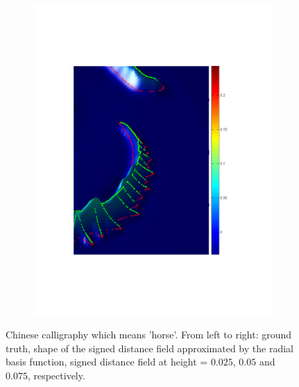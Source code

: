 \documentclass[review]{acmsiggraph}
\begin{document}
\begin{figure}
\begin{subfigure}[b]{0.25\linewidth}
                \includegraphics[width=\textwidth]{images/seahorse/3.pdf}
        \end{subfigure}
        \caption{Chinese calligraphy which means 'horse'. From left to right: ground truth, shape of the signed distance field approximated by the radial basis function, signed distance field at height = $0.025$, $0.05$ and $0.075$, respectively. }
				\label{fig:horse}
\end{figure}
\end{document}
